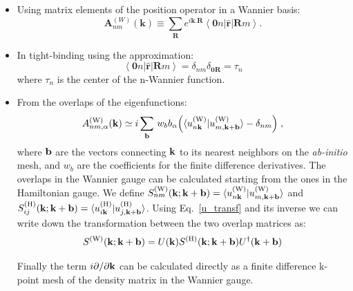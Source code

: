 \documentclass[preprint,showpacs,prb,superscriptaddress,aps,floatfix]{revtex4-1}
\newcommand{\bb}{{\bf b}}
\newcommand{\kk}{{\bf k}}
\newcommand{\be}{\begin{equation}}
\newcommand{\ee}{\end{equation}}
\renewcommand{\[}{\left[}
\renewcommand{\]}{\right]}
\renewcommand{\(}{\left(}
\renewcommand{\)}{\right)}
\def\pw{^{({\rm W})}}
\def\ph{^{({\rm H})}}
\begin{document}
\begin{itemize}
\item
Using matrix elements of the position operator in a Wannier basis:
\be
\boldsymbol{A}_{nm}^{(W)}\left(\boldsymbol{k}\right)  \equiv\sum_{\boldsymbol{R}}e^{i\boldsymbol{k}.\boldsymbol{R}}\left\langle \boldsymbol{0}n\left|\hat{\boldsymbol{r}}\right|\boldsymbol{R}m\right\rangle .\label{eq:Berry_connection_Wannier}
\ee
\item In tight-binding using the approximation:\cite{silva2019high}
\be
		\left\langle \boldsymbol{0}n\left|\hat{\boldsymbol{r}}\right|\boldsymbol{R}m\right\rangle=\delta_{nm}\delta_{\boldsymbol{0} \boldsymbol{R}} = \tau_n
\ee
where $\tau_n$ is the center of the n-Wannier function.
\item 
	From the overlaps of the eigenfunctions:\cite{wang2006ab}
	\begin{equation}
        A_{nm,\alpha}\pw(\kk)\simeq
        i\sum_\bb\,
        w_b b_{\alpha}\Big ( \langle u_{n\kk}\pw|u_{m,\kk+\bb}\pw
        \rangle
        - \delta_{nm}\Big )\;,
\label{eq:A_dis}
\end{equation}
%
where $\bb$ are the vectors connecting $\kk$ to its nearest
		neighbors on the {\it ab-initio} mesh, and $w_b$ are the coefficients for the finite difference derivatives. The overlaps in the Wannier gauge can be calculated starting from the ones in the Hamiltonian gauge. We define $S\pw_{nm}(\kk;\kk+\bb) =  \langle u_{n\kk}\pw|u_{m,\kk+\bb}\pw \rangle$ and $S\ph_{ij}(\kk;\kk+\bb) =  \langle u_{i\kk}\ph|u_{j,\kk+\bb}\ph \rangle$. Using Eq.~\ref{u_transf} and its inverse we can write down the transformation between the two overlap matrices as:
\be
		S\pw(\kk;\kk+\bb) = U(\kk) S\ph(\kk;\kk+\bb) U^\dagger(\kk+\bb)
\ee
 
Finally the term  $i {\partial}/{\partial \kk}$ can be calculated directly as a finite difference k-point mesh of the density matrix in the Wannier gauge.
\end{itemize}
\end{document}
